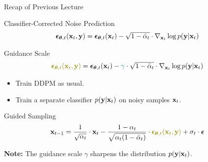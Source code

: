 \documentclass{beamer}
\begin{document}
\begin{frame}{Recap of Previous Lecture}
	\begin{block}{Classifier-Corrected Noise Prediction}
		\vspace{-0.3cm}
		\[
			\boldsymbol{\epsilon}_{\boldsymbol{\theta}, t}(\mathbf{x}_t, \mathbf{y}) = \boldsymbol{\epsilon}_{\boldsymbol{\theta}, t}(\mathbf{x}_t) - \sqrt{1 - \bar{\alpha}_t} \cdot \nabla_{\mathbf{x}_t} \log p(\mathbf{y} | \mathbf{x}_t)
		\]
		\vspace{-0.7cm}
	\end{block}
	\begin{block}{Guidance Scale}
		\vspace{-0.3cm}
		\[
			{\color{olive}\bepsilon_{\btheta, t}(\bx_t, \by)} = \bepsilon_{\btheta, t}(\bx_t) - {\color{teal}\gamma} \cdot \sqrt{1 - \bar{\alpha}_t} \cdot \nabla_{\bx_t} \log p(\by | \bx_t)
		\]
		\vspace{-0.5cm}
	\end{block}
	\begin{itemize}
		\item Train DDPM as usual.
		\item Train a separate classifier $p(\mathbf{y} | \mathbf{x}_t)$ on noisy samples $\mathbf{x}_t$.
	\end{itemize}
	\begin{block}{Guided Sampling}
		\vspace{-0.3cm}
		\[
			\bx_{t-1} = \frac{1}{\sqrt{\alpha_t}} \cdot \bx_t - \frac{1 - \alpha_t}{\sqrt{\alpha_t (1 - \bar{\alpha}_t)}} \cdot  {\color{olive}\bepsilon_{\btheta, t}(\bx_t, \by)} + \sigma_t \cdot \bepsilon
		\]
		\vspace{-0.3cm}
	\end{block}
	\textbf{Note:} The guidance scale $\gamma$ sharpens the distribution $p(\mathbf{y} | \mathbf{x}_t)$.
\end{frame}
\end{document}

